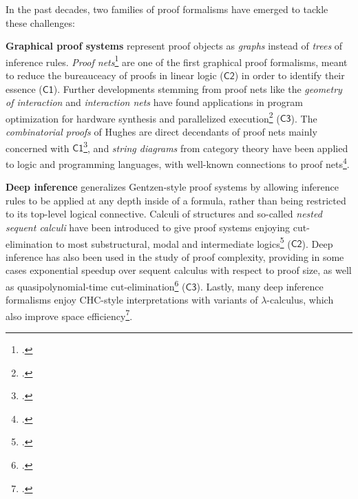 \documentclass[11pt]{msca-pf}
\newcommand{\CH}[1]{$\mathsf{C#1}$}
\begin{document}
In the past decades, two families of proof formalisms have emerged to tackle these challenges:
\begin{description}
    \item \textbf{Graphical proof systems} represent proof objects as \emph{graphs} instead of
    \emph{trees} of inference rules.
    \emph{Proof nets}\footcite{girard-linear-1987} are one of the first graphical proof formalisms,
    meant to reduce the bureauceacy of proofs in linear logic (\CH{2}) in order to identify their
    essence (\CH{1}). Further developments stemming from proof nets like the \emph{geometry of
    interaction} and \emph{interaction nets} have found applications in program optimization for
    hardware synthesis and parallelized
    execution\footcite{ghicaGeometrySynthesisStructured2007,mackieInteractionNetImplementation2011}
    (\CH{3}). The \emph{combinatorial proofs} of Hughes are direct decendants of proof nets mainly
    concerned with \CH{1}\footcite{Hughes_2006}, and \emph{string diagrams} from category theory have
    been applied to logic and programming languages, with well-known connections to proof
    nets\footcite{piedeleuIntroductionStringDiagrams2025}.

    \item \textbf{Deep inference} generalizes Gentzen-style proof systems by allowing inference
    rules to be applied at any depth inside of a formula, rather than being restricted to its
    top-level logical connective.
    Calculi of structures and so-called \emph{nested sequent calculi} have been introduced to give
    proof systems enjoying cut-elimination to most substructural, modal and intermediate
    logics\footcite{kuznets_maehara-style_2019,postniece_proof_2010} (\CH{2}). Deep inference has
    also been used in the study of proof complexity, providing in some cases exponential speedup
    over sequent calculus with respect to proof size, as well as quasipolynomial-time
    cut-elimination\footcite{dasRelativeProofComplexity2015a,bruscoliQuasipolynomialNormalisationDeep2016a}
    (\CH{3}). Lastly, many deep inference formalisms enjoy CHC-style interpretations with variants
    of $\lambda$-calculus, which also improve space
    efficiency\footcite{guenot_nested_2013,gundersenAtomicLambdaCalculus2013}.
\end{description}
\end{document}
